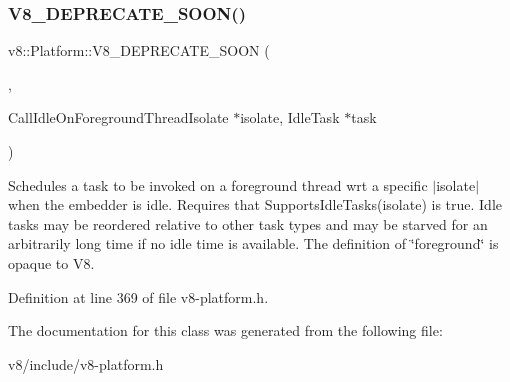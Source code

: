 \subsubsection{\texorpdfstring{V8\+\_\+\+D\+E\+P\+R\+E\+C\+A\+T\+E\+\_\+\+S\+O\+O\+N()}{V8\_DEPRECATE\_SOON()}\hspace{0.1cm}{\footnotesize\ttfamily [3/3]}}
{\footnotesize\ttfamily v8\+::\+Platform\+::\+V8\+\_\+\+D\+E\+P\+R\+E\+C\+A\+T\+E\+\_\+\+S\+O\+ON (\begin{DoxyParamCaption}\item[{\char`\"{}Use a taskrunner acquired by \mbox{\hyperlink{classv8_1_1Platform_af0d18c6bbefa133c5d11ec8a460d0278}{Get\+Foreground\+Task\+Runner}} instead.\char`\"{}}]{,  }\item[{virtual void }]{Call\+Idle\+On\+Foreground\+ThreadIsolate $\ast$isolate, Idle\+Task $\ast$task }\end{DoxyParamCaption})\hspace{0.3cm}{\ttfamily [inline]}}

Schedules a task to be invoked on a foreground thread wrt a specific $\vert$isolate$\vert$ when the embedder is idle. Requires that Supports\+Idle\+Tasks(isolate) is true. Idle tasks may be reordered relative to other task types and may be starved for an arbitrarily long time if no idle time is available. The definition of \char`\"{}foreground\char`\"{} is opaque to V8. 

Definition at line 369 of file v8-\/platform.\+h.



The documentation for this class was generated from the following file\+:\begin{DoxyCompactItemize}
\item 
v8/include/v8-\/platform.\+h\end{DoxyCompactItemize}
